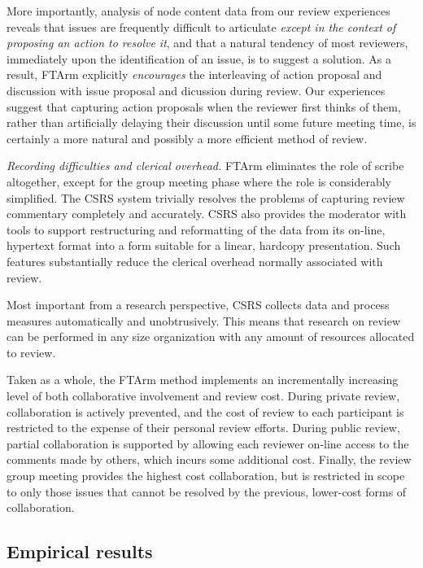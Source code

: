 \begin{itemizenoindent}
  More importantly, analysis of node content data from our review
  experiences reveals that issues are frequently difficult to articulate
  {\em except in the context of proposing an action to resolve it}, and
  that a natural tendency of most reviewers, immediately upon the
  identification of an issue, is to suggest a solution.  As a result,
  FTArm explicitly {\em encourages} the interleaving of action proposal
  and discussion with issue proposal and dicussion during review.  Our
  experiences suggest that capturing action proposals when the reviewer
  first thinks of them, rather than artificially delaying their
  discussion until some future meeting time, is certainly a more natural
  and possibly a more efficient method of review.
  
\item {\em Recording difficulties and clerical overhead.} FTArm
  eliminates the role of scribe altogether, except for the group meeting
  phase where the role is considerably simplified.  The CSRS system
  trivially resolves the problems of capturing review commentary completely
  and accurately.  CSRS also provides the moderator with tools to support
  restructuring and reformatting of the data from its on-line, hypertext
  format into a form suitable for a linear, hardcopy presentation.  Such
  features substantially reduce the clerical overhead normally associated
  with review.
 
  Most important from a research perspective, CSRS collects data and
  process measures automatically and unobtrusively.  This means that
  research on review can be performed in any size organization with any
  amount of resources allocated to review.

\end{itemizenoindent}

Taken as a whole, the FTArm method implements an incrementally increasing
level of both collaborative involvement and review cost.  During private
review, collaboration is actively prevented, and the cost of review to each
participant is restricted to the expense of their personal review efforts.
During public review, partial collaboration is supported by allowing each
reviewer on-line access to the comments made by others, which incurs some
additional cost.  Finally, the review group meeting provides the highest
cost collaboration, but is restricted in scope to only those issues that
cannot be resolved by the previous, lower-cost forms of collaboration.

\subsection{Empirical results}

